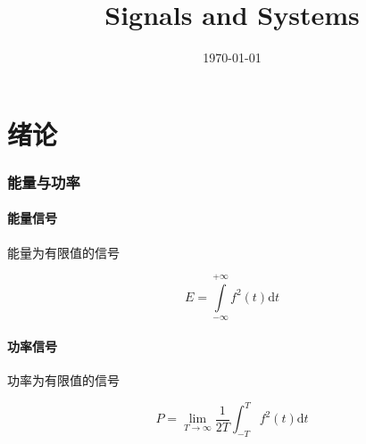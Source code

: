 \documentclass{article}
\title{Signals and Systems}
\author{}
\date{\today}
\begin{document}
\hypersetup{
    hidelinks,
    allcolors = black,
    breaklinks = true
}

\newtheorem{definition}{Definition}[subsection]
\newtheorem{theorem}{Theorem}[subsection]
\newtheorem{corollary}{Corollary}[theorem]
\renewcommand{\proofname}{\indent\bf Proof}

\def\e{\mathrm e}
\def\i{\mathrm i}
\def\j{\mathrm j}
\def\d{\mathrm d}
\def\C{\mathrm C}
\def\div{\mathrm{div}}
\def\rot{\mathrm{rot}}
\def\vecv{\vec{\mathrm v}}
\def\sr{\mathbb R}
\def\sn{\mathbb N}
\def\snp{\mathbb N^+}
\def\sc{\mathbb C}
\def\sz{\mathbb Z}
\def\impint{\int\limits_{-\infty}^{+\infty}}

\newcommand{\abs}[1]{\left|#1\right|}
\newcommand{\pare}[1]{\left(#1\right)}
\newcommand{\fourier}[1]{\mathscr F\pare{#1}}
\newcommand{\tfourier}[1]{\mathscr F^{-1}\pare{#1}}
\newcommand{\jacobi}[2]{\frac{\partial\pare{#1}}{\partial\pare{#2}}}

\def\ft{f\pare{t}}

\begin{titlepage}
    \maketitle
\end{titlepage}

\tableofcontents
\newpage

\part{绪论}

\section{能量与功率}

\subsection{能量信号}

能量为有限值的信号

\[E=\impint f^2\pare{t}\d t\]

\subsection{功率信号}

功率为有限值的信号

\[P=\lim_{T\to\infty}\frac1{2T}\int_{-T}^Tf^2\pare{t}\d t\]
\end{document}
